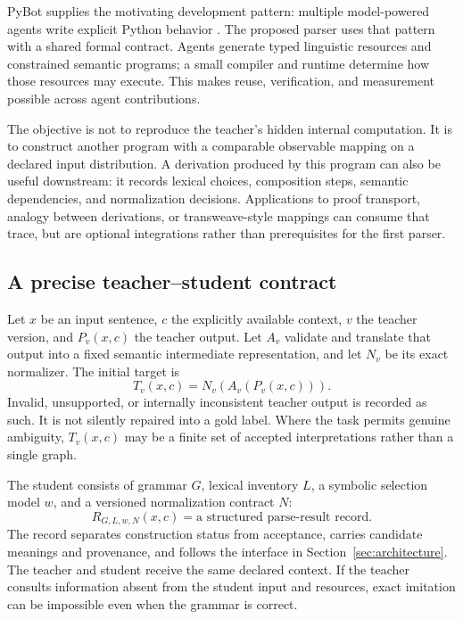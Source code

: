 \documentclass[11pt,a4paper]{article}
\begin{document}
PyBot supplies the motivating development pattern: multiple model-powered
agents write explicit Python behavior \cite{pybot}. The proposed parser uses
that pattern with a shared formal contract. Agents generate typed linguistic
resources and constrained semantic programs; a small compiler and runtime
determine how those resources may execute. This makes reuse, verification, and
measurement possible across agent contributions.

The objective is not to reproduce the teacher's hidden internal computation.
It is to construct another program with a comparable observable mapping on a
declared input distribution. A derivation produced by this program can also be
useful downstream: it records lexical choices, composition steps, semantic
dependencies, and normalization decisions. Applications to proof transport,
analogy between derivations, or transweave-style mappings can consume that
trace, but are optional integrations rather than prerequisites for the first
parser.

\subsection{A precise teacher--student contract}
Let \(x\) be an input sentence, \(c\) the explicitly available context, \(v\)
the teacher version, and \(P_v(x,c)\) the teacher output. Let \(A_v\) validate
and translate that output into a fixed semantic intermediate representation,
and let \(N_v\) be its exact normalizer. The initial target is
\begin{equation}
  T_v(x,c)=N_v(A_v(P_v(x,c))).
  \label{eq:target}
\end{equation}
Invalid, unsupported, or internally inconsistent teacher output is recorded as
such. It is not silently repaired into a gold label. Where the task permits
genuine ambiguity, \(T_v(x,c)\) may be a finite set of accepted
interpretations rather than a single graph.

The student consists of grammar \(G\), lexical inventory \(L\), a symbolic
selection model \(w\), and a versioned normalization contract \(N\):
\[
   R_{G,L,w,N}(x,c)=\text{a structured parse-result record}.
\]
The record separates construction status from acceptance, carries candidate
meanings and provenance, and follows the interface in
Section~\ref{sec:architecture}.
The teacher and student receive the same declared context. If the teacher
consults information absent from the student input and resources, exact
imitation can be impossible even when the grammar is correct.
\end{document}
